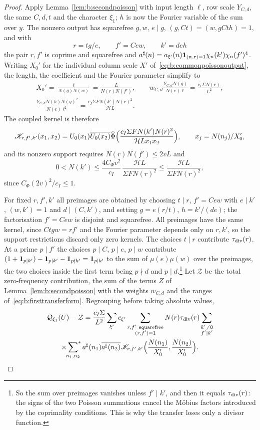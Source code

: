 \begin{proof}
Apply Lemma~\ref{lem:b:secondpoisson} with input length $\ell$, row scale $Y_{C,d}$, the same $C,d,t$ and the character $\xi_1$; $h$ is now the Fourier variable of the sum over $y$. The nonzero output has squarefree $g,w$, $e\mid g$, $(g,Ct)=(w,gCth)=1$, and with
\[
  r=tg/e,\qquad f'=Cew,\qquad k'=deh
\]
the pair $r,f'$ is coprime and squarefree and $a^\sharp(n)=a_{\xi'}(n)\mathbf{1}_{(n,r)=1}\chi_n(k')\chi_n(f')^4$. Writing $X_0'$ for the individual column scale $X'$ of~\eqref{eq:b:commonpoissonoutput}, the length, the coefficient and the Fourier parameter simplify to
\[
  \begin{gathered}
  X_0'=\frac\ell{N(g)N(w)}=\frac L{N(r)N(f')},\qquad w_{C,d}\frac{Y_{C,d}N(g)}{N(e)\ell}=\frac{c_I\Sigma N(r)}{L^2},\\
  \frac{Y_{C,d}N(h)N(g)^2}{N(e)\ell^2}=\frac{c_I\Sigma FN(k')N(r)^2}{\mathcal HL}.
  \end{gathered}
\]
The coupled kernel is therefore
\[
  \mathscr K_{r,f',k'}(x_1,x_2)=U_0(x_1)\overline{U_0(x_2)}\widehat\Phi\Bigl(\frac{c_I\Sigma FN(k')N(r)^2}{\mathcal HLx_1x_2}\Bigr),\qquad x_j=N(n_j)/X_0',
\]
and its nonzero support requires $N(r)N(f')\le2vL$ and
\[
  0<N(k')\le\frac{4C_\Phi v^2}{c_I}\,\frac{\mathcal HL}{\Sigma FN(r)^2}\le\frac{\mathcal HL}{\Sigma FN(r)^2},
\]
since $C_\Phi(2v)^2/c_I\le1$.

For fixed $r,f',k'$ all preimages are obtained by choosing $t\mid r$, $f'=Cew$ with $e\mid k'$, $(w,k')=1$ and $d\mid(C,k')$, and setting $g=e(r/t)$, $h=k'/(de)$; the factorisation $f'=Cew$ is disjoint and squarefree. All preimages have the same kernel, since $Ctgw=rf'$ and the Fourier parameter depends only on $r,k'$, so the support restrictions discard only zero kernels. The choices $t\mid r$ contribute $\tau_{\rm div}(r)$. At a prime $p\mid f'$ the choices $p\mid C$, $p\mid e$, $p\mid w$ contribute $(1+\mathbf{1}_{p\mid k'})-\mathbf{1}_{p\mid k'}-\mathbf{1}_{p\nmid k'}=\mathbf{1}_{p\mid k'}$ to the sum of $\mu(e)\mu(w)$ over the preimages, the two choices inside the first term being $p\nmid d$ and $p\mid d$.\footnote{So the sum over preimages vanishes unless $f'\mid k'$, and then it equals $\tau_{\rm div}(r)$: the signs of the two Poisson summations cancel the M\"obius factors introduced by the coprimality conditions. This is why the transfer loses only a divisor function.} Let $\mathcal Z$ be the total zero-frequency contribution, the sum of the terms $Z$ of Lemma~\ref{lem:b:secondpoisson} with the weights $w_{C,d}$ and the ranges of~\eqref{eq:b:firsttransferform}. Regrouping before taking absolute values,
\begin{multline*}
  \mathcal Q_{\xi_1}(U)-\mathcal Z=\frac{c_I\Sigma}{L^2}\sum_{\xi'}c_{\xi'}\sum_{\substack{r,f'\ {\rm squarefree}\\(r,f')=1}}N(r)\tau_{\rm div}(r)\sum_{\substack{k'\ne0\\f'\mid k'}}\\
  \times\sideset{}{^*}\sum_{n_1,n_2}a^\sharp(n_1)\overline{a^\sharp(n_2)}\mathscr K_{r,f',k'}\Bigl(\frac{N(n_1)}{X_0'},\frac{N(n_2)}{X_0'}\Bigr).
\end{multline*}


\end{proof}
